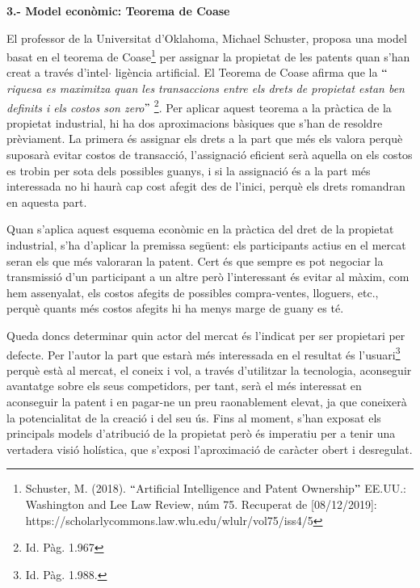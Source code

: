 \documentclass[12pt]{article}
\begin{document}
\begin{justify}
\textbf{3.- Model econòmic: Teorema de Coase}
\end{justify}\par


\vspace{\baselineskip}
\begin{justify}
El professor de la Universitat d’Oklahoma, Michael Schuster, proposa una model basat en el teorema de Coase\footnote{ Schuster, M. (2018). $``$Artificial Intelligence and Patent Ownership$"$  EE.UU.: Washington and Lee Law Review, núm 75. Recuperat de [08/12/2019]: https://scholarlycommons.law.wlu.edu/wlulr/vol75/iss4/5 } per assignar la propietat de les patents quan s’han creat a través d’intel$ \cdot $ ligència artificial.  El Teorema de Coase afirma que la $``$\textit{riquesa es maximitza quan les transaccions entre els drets de propietat estan ben definits i els costos son zero}$"$ \footnote{ Id. Pàg. 1.967 }. Per aplicar aquest teorema a la pràctica de la propietat industrial, hi ha dos aproximacions bàsiques que s’han de resoldre prèviament. La primera és assignar els drets a la part que més els valora perquè suposarà evitar costos de transacció, l’assignació eficient serà aquella on els costos es trobin per sota dels possibles guanys, i si la assignació és a la part més interessada no hi haurà cap cost afegit des de l’inici, perquè els drets romandran en aquesta part. 
\end{justify}\par


\vspace{\baselineskip}
\begin{justify}
Quan s’aplica aquest esquema econòmic en la pràctica del dret de la propietat industrial, s’ha d’aplicar la premissa següent: els participants actius en el mercat seran els que més valoraran la patent. Cert és que sempre es pot negociar la transmissió d’un participant a un altre però l’interessant és evitar al màxim, com hem assenyalat, els costos afegits de possibles compra-ventes, lloguers, etc., perquè quants més costos afegits hi ha menys marge de guany es té.
\end{justify}\par


\vspace{\baselineskip}
\begin{justify}
Queda doncs determinar quin actor del mercat és l’indicat per ser propietari per defecte. Per l’autor la part que estarà més interessada en el resultat és l’usuari\footnote{ Id. Pàg. 1.988. } perquè està al mercat, el coneix i vol, a través d’utilitzar la tecnologia, aconseguir avantatge sobre els seus competidors, per tant, serà el més interessat en aconseguir la patent i en pagar-ne un preu raonablement elevat, ja que coneixerà la potencialitat de la creació i del seu ús.  Fins al moment, s’han exposat els principals models d’atribució de la propietat però és imperatiu per a tenir una vertadera visió holística, que s’exposi l’aproximació de caràcter obert i desregulat.
\end{justify}\par
\end{document}
